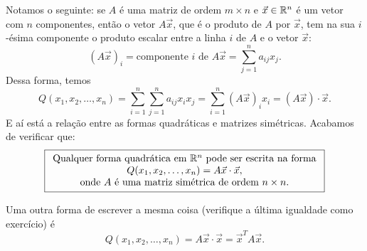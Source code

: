 \documentclass[../livro.tex]{subfiles}
\begin{document}
Notamos o seguinte: se $A$ é uma matriz de ordem $m \times n$ e $\vec{x} \in \mathbb{R}^n$ é um vetor com $n$ componentes, então o vetor $A \vec{x}$, que é o produto de $A$ por $\vec{x}$, tem na sua $i$-ésima componente o produto escalar entre a linha $i$ de $A$ e o vetor $\vec{x}$:
\[
\left( A \vec{x} \right)_i = \text{componente $i$ de } A \vec{x} = \sum_{j=1}^{n} a_{ij} x_j.
\] Dessa forma, temos
\[
Q(x_1, x_2, \dots, x_n) = \sum_{i=1}^{n} \sum_{j=1}^{n} a_{ij} x_i x_j = \sum_{i=1}^{n} \left( A \vec{x} \right)_i x_i  =  \left( A \vec{x} \right) \cdot \vec{x}.
\] E aí está a relação entre as formas quadráticas e matrizes simétricas. Acabamos de verificar que:
\[
\boxed{\begin{array}{c}
	\text{Qualquer forma quadrática em $\mathbb{R}^n$ pode ser escrita na forma} \\
	Q(x_1, x_2, \dots, x_n) = A \vec{x}  \cdot \vec{x}, \\
	\text{onde $A$ é uma matriz simétrica de ordem $n\times n$.}
	\end{array}}
\]

\noindent Uma outra forma de escrever a mesma coisa (verifique a última igualdade como exercício) é
\[
Q(x_1, x_2, \dots, x_n) = A \vec{x}  \cdot \vec{x} = \vec{x}^T A \vec{x}.
\]
\end{document}

